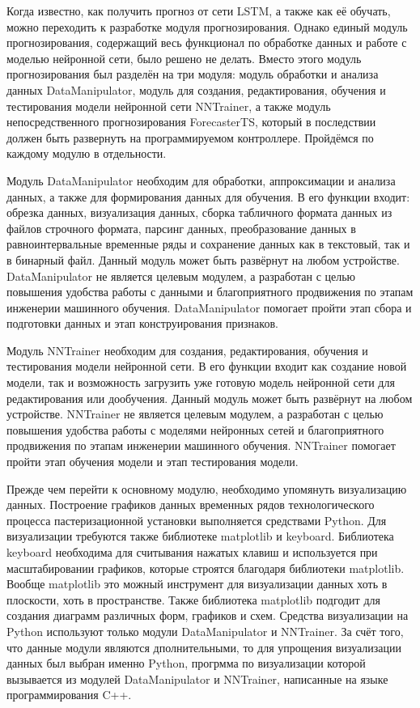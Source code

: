 {\gostFont

  \par \redline Когда известно, как получить прогноз от сети LSTM, а также как её обучать, можно переходить к разработке модуля прогнозирования. Однако единый модуль прогнозирования, содержащий весь функционал по обработке данных и работе с моделью нейронной сети, было решено не делать. Вместо этого модуль прогнозирования был разделён на три модуля: модуль обработки и анализа данных DataManipulator, модуль для создания, редактирования, обучения и тестирования модели нейронной сети NNTrainer, а также модуль непосредственного прогнозирования ForecasterTS, который в последствии должен быть развернуть на программируемом контроллере. Пройдёмся по каждому модулю в отдельности. 

  \par \redline Модуль DataManipulator необходим для обработки, аппроксимации и анализа данных, а также для формирования данных для обучения. В его функции входит: обрезка данных, визуализация данных, сборка табличного формата данных из файлов строчного формата, парсинг данных, преобразование данных в равноинтервальные временные ряды и сохранение данных как в текстовый, так и в бинарный файл. Данный модуль может быть развёрнут на любом устройстве. DataManipulator не является целевым модулем, а разработан с целью повышения удобства работы с данными и благоприятного продвижения по этапам инженерии машинного обучения. DataManipulator помогает пройти этап сбора и подготовки данных и этап конструирования признаков. 

  \par \redline Модуль NNTrainer необходим для создания, редактирования, обучения и тестирования модели нейронной сети. В его функции входит как создание новой модели, так и возможность загрузить уже готовую модель нейронной сети для редактирования или дообучения. Данный модуль может быть развёрнут на любом устройстве. NNTrainer не является целевым модулем, а разработан с целью повышения удобства работы с моделями нейронных сетей и благоприятного продвижения по этапам инженерии машинного обучения. NNTrainer помогает пройти этап обучения модели и этап тестирования модели.
  
  \par \redline Прежде чем перейти к основному модулю, необходимо упомянуть визуализацию данных. Построение графиков данных временных рядов технологического процесса пастеризационной установки выполняется средствами Python. Для визуализации требуются также библиотеке matplotlib и keyboard. Библиотека keyboard необходима для считывания нажатых клавиш и используется при масштабировании графиков, которые строятся благодаря библиотеки matplotlib. Вообще matplotlib это можный инструмент для визуализации данных хоть в плоскости, хоть в пространстве. Также библиотека matplotlib подгодит для создания диаграмм различных форм, графиков и схем. Средства визуализации на Python используют только модули DataManipulator и NNTrainer. За счёт того, что данные модули являются дполнительными, то для упрощения визуализации данных был выбран именно Python, прогрмма по визуализации которой вызывается из модулей DataManipulator и NNTrainer, написанные на языке программирования C++.

}
